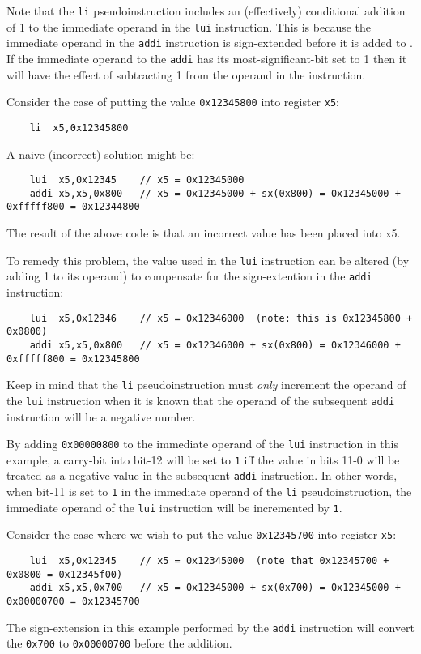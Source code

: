 Note that the {\tt li} pseudoinstruction includes an (effectively) conditional addition 
of 1 to the immediate operand
in the {\tt lui} instruction.  This is because the immediate operand in the
{\tt addi} instruction is sign-extended before it is added to \verb@rd@.
If the immediate operand to the {\tt addi} has its most-significant-bit set to 1 then
it will have the effect of subtracting 1 from the operand in the \verb@lui@ instruction.

Consider the case of putting the value {\tt 0x12345800} into register {\tt x5}:

{\small
\begin{verbatim}
    li  x5,0x12345800
\end{verbatim}
}
{\color{red}
A naive (incorrect) solution might be:
{\small
\begin{verbatim}
    lui  x5,0x12345    // x5 = 0x12345000
    addi x5,x5,0x800   // x5 = 0x12345000 + sx(0x800) = 0x12345000 + 0xfffff800 = 0x12344800
\end{verbatim}
}
The result of the above code is that an incorrect value has been placed into x5.  
}

To remedy this problem, the value used in the {\tt lui} instruction can be altered 
(by adding 1 to its operand) to compensate for the sign-extention in the {\tt addi} 
instruction:
{\small
\begin{verbatim}
    lui  x5,0x12346    // x5 = 0x12346000  (note: this is 0x12345800 + 0x0800)
    addi x5,x5,0x800   // x5 = 0x12346000 + sx(0x800) = 0x12346000 + 0xfffff800 = 0x12345800
\end{verbatim}
}

Keep in mind that the {\tt li} pseudoinstruction must {\em only} increment the operand 
of the {\tt lui} instruction when it is known that the operand of the subsequent 
{\tt addi} instruction will be a negative number.

%
By adding {\tt 0x00000800} to the immediate operand of the {\tt lui} instruction in
this example, a carry-bit into bit-12 will be set to {\tt 1} iff the value in
bits 11-0 will be treated as a negative value in the subsequent {\tt addi} instruction.
In other words, when bit-11 is set to {\tt 1} in the immediate operand of the {\tt li} 
pseudoinstruction, the immediate operand of the {\tt lui} instruction will be 
incremented by {\tt 1}.

Consider the case where we wish to put the value {\tt 0x12345700} into register {\tt x5}:
{\small
\begin{verbatim}
    lui  x5,0x12345    // x5 = 0x12345000  (note that 0x12345700 + 0x0800 = 0x12345f00)
    addi x5,x5,0x700   // x5 = 0x12345000 + sx(0x700) = 0x12345000 + 0x00000700 = 0x12345700
\end{verbatim}
}
The sign-extension in this example performed by the {\tt addi} instruction will convert the
{\tt 0x700} to {\tt 0x00000700} before the addition.

